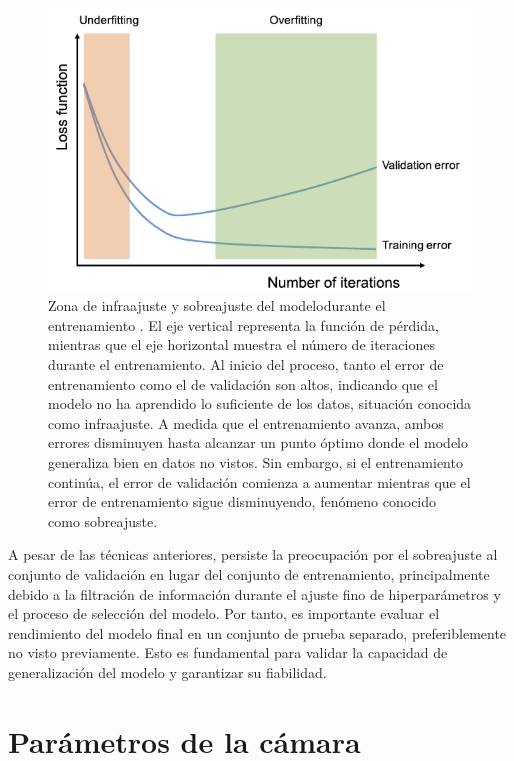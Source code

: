 \begin{figure}[H]
	\centering
	\includegraphics[scale=0.8]{imagenes/cap2/sobreajuste.png}
	\caption[Infraajuste y sobreajuste en entrenamiento.]{Zona de infraajuste y sobreajuste del modelodurante el entrenamiento \cite{40}. El eje vertical representa la función de pérdida, mientras que el eje horizontal muestra el número de iteraciones durante el entrenamiento. Al inicio del proceso, tanto el error de entrenamiento como el de validación son altos, indicando que el modelo no ha aprendido lo suficiente de los datos, situación conocida como infraajuste. A medida que el entrenamiento avanza, ambos errores disminuyen hasta alcanzar un punto óptimo donde el modelo generaliza bien en datos no vistos. Sin embargo, si el entrenamiento continúa, el error de validación comienza a aumentar mientras que el error de entrenamiento sigue disminuyendo, fenómeno conocido como sobreajuste.}
	\label{fig10}
\end{figure}

A pesar de las técnicas anteriores, persiste la preocupación por el sobreajuste al conjunto de validación en lugar del conjunto de entrenamiento, principalmente debido a la filtración de información durante el ajuste fino de hiperparámetros y el proceso de selección del modelo. Por tanto, es importante evaluar el rendimiento del modelo final en un conjunto de prueba separado, preferiblemente no visto previamente. Esto es fundamental para validar la capacidad de generalización del modelo y garantizar su fiabilidad.


\section{Parámetros de la cámara}\label{param_camera}

